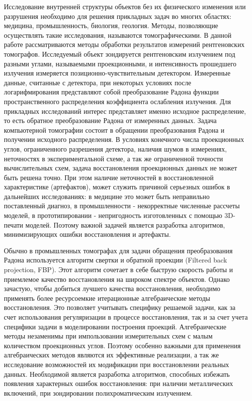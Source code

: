 
{\actualityandprogress} 

Исследование внутренней структуры объектов без их физического изменения или разрушения необходимо для решения прикладных задач во многих областях:  медицина, промышленность, биология, геология.
Методы, позволяющие осуществлять такие исследования, называются томографическими.
В данной работе рассматриваются методы обработки результатов измерений рентгеновских томографов.
Исследуемый объект зондируется рентгеновским излучением под разными углами, называемыми проекционными, и интенсивность прошедшего излучения измеряется позиционно-чувствительным детектором.
Измеренные данные, считанные с детектора, при некоторых условиях после логарифмирования представляют собой преобразование Радона функции пространственного распределения коэффициента ослабления излучения.
Для прикладных исследований интерес представляет именно исходное распределение, то есть обратное преобразование Радона от измеренных данных.
Задача компьютерной томографии состоит в обращении преобразования Радона и получении исходного распределения.
В условиях конечного числа проекционных углов, ограниченного разрешения детектора, наличия шумов в измерениях, неточностях в экспериментальной схеме, а так же ограниченной точности вычислительных схем, задача восстановления проекционных данных не может быть решена точно.
При этом наличие неточностей в восстановленной характеристике (артефактов), может служить причиной серьезных ошибок в дальнейших исследованиях: в медицине это может быть неправильно поставленный диагноз, в промышленности - некорректные численные рассчеты моделей, в прототипировании - непригодность изготовленных с помощью 3D-печати моделей.
Поэтому важной задачей является разработка алгоритмов, минимизирующих ошибки восстановления и артефакты.

Обычно в промышленных томографах для задачи обращения преобразования Радона используется алгоритм свертки и обратной проекции (Filtered back projection, FBP).
Этот алгоритм сочетает в себе быструю скорость работы и приемлемое качество восстановления на широком спектре объектов.
Однако зачастую, чтобы добиться лучшего качества восстановления, необходимо применять более ресурсоемкие итерационные алгебраические методы восстановления.
Это позволяет учитывать специфику решаемой задачи, как за счет использования регуляризации в процессе восстановления, так и за счет учета специфики задачи в моделировании построения проекций.
Алгебраические методы незаменимы при импользовании измерительных схем с малым количеством проекционных углов. 
Поэтому особенно важными для применения алгебраических методов являются их эффективные реализации, а так же исследование возможностей их модификации при восстановлении реальных данных.
Необходимой является разработка алгоритмов, способных избежать появления характерных ошибок восстановления: при наличии металлических включений, при зондировании полихроматическим излучением.

